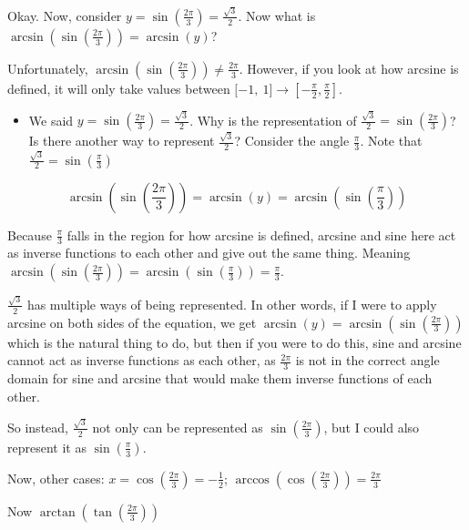 \documentclass[12pt]{article}
\theoremstyle{plain}
\theoremstyle{remark}
\theoremstyle{definition}
\begin{document}
Okay. Now, consider
\(y = \sin\left( \frac{2\pi}{3} \right) = \frac{\sqrt{3}}{2}\). Now what
is
\(\arcsin\left( \sin\left( \frac{2\pi}{3} \right) \right) = \arcsin(y)\)?

Unfortunately,
\(\arcsin\left( \sin\left( \frac{2\pi}{3} \right) \right) \neq \frac{2\pi}{3}\).
However, if you look at how arcsine is defined, it will only take values
between
\(\lbrack - 1,\ 1\rbrack \rightarrow \left\lbrack - \frac{\pi}{2},\frac{\pi}{2} \right\rbrack\).

\begin{itemize}
\item
  We said
  \(y = \sin\left( \frac{2\pi}{3} \right) = \frac{\sqrt{3}}{2}\). Why is
  the representation of
  \(\frac{\sqrt{3}}{2} = \sin\left( \frac{2\pi}{3} \right)\)? Is there
  another way to represent \(\frac{\sqrt{3}}{2}\)? Consider the angle
  \(\frac{\pi}{3}\). Note that
  \(\frac{\sqrt{3}}{2} = \sin\left( \frac{\pi}{3} \right)\)
\end{itemize}

\[\arcsin\left( \sin\left( \frac{2\pi}{3} \right) \right) = \arcsin(y) = \arcsin\left( \sin\left( \frac{\pi}{3} \right) \right)\]

Because \(\frac{\pi}{3}\) falls in the region for how arcsine is
defined, arcsine and sine here act as inverse functions to each other
and give out the same thing. Meaning
\(\arcsin\left( \sin\left( \frac{2\pi}{3} \right) \right) = \arcsin\left( \sin\left( \frac{\pi}{3} \right) \right) = \frac{\pi}{3}\).

\(\frac{\sqrt{3}}{2}\) has multiple ways of being represented. In other
words, if I were to apply arcsine on both sides of the equation, we get
\(\arcsin(y) = \arcsin\left( \sin\left( \frac{2\pi}{3} \right) \right)\)
which is the natural thing to do, but then if you were to do this, sine
and arcsine cannot act as inverse functions as each other, as
\(\frac{2\pi}{3}\) is not in the correct angle domain for sine and
arcsine that would make them inverse functions of each other.

So instead, \(\frac{\sqrt{3}}{2}\) not only can be represented as
\(\sin\left( \frac{2\pi}{3} \right)\), but I could also represent it as
\(\sin\left( \frac{\pi}{3} \right)\).

Now, other cases:
\(x = \cos\left( \frac{2\pi}{3} \right) = - \frac{1}{2}\);
\(\arccos\left( \cos\left( \frac{2\pi}{3} \right) \right) = \frac{2\pi}{3}\)

Now \(\arctan\left( \tan\left( \frac{2\pi}{3} \right) \right)\)
\end{document}
